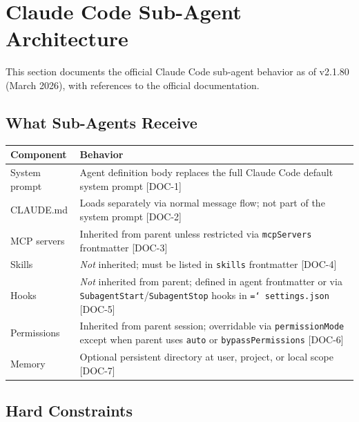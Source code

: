 \documentclass[a4paper,10pt]{article}
\newcommand{\fpath}[1]{\texttt{\hyphenchar\font=`\/ #1}}
\newcommand{\field}[1]{\texttt{#1}}
\newcommand{\coderef}[1]{\textsf{\small [#1]}}
\begin{document}
\section{Claude Code Sub-Agent Architecture}
\label{sec:architecture}

This section documents the official Claude Code sub-agent behavior
as of v2.1.80 (March 2026), with references to the official
documentation.

\subsection{What Sub-Agents Receive}

\begin{center}
\begin{tabularx}{\textwidth}{@{}lX@{}}
\toprule
\textbf{Component} & \textbf{Behavior} \\
\midrule
System prompt & Agent definition body replaces the full
  Claude Code default system prompt \coderef{DOC-1} \\
CLAUDE.md & Loads separately via normal message flow; not
  part of the system prompt \coderef{DOC-2} \\
MCP servers & Inherited from parent unless restricted via
  \field{mcpServers} frontmatter \coderef{DOC-3} \\
Skills & \emph{Not} inherited; must be listed in
  \field{skills} frontmatter \coderef{DOC-4} \\
Hooks & \emph{Not} inherited from parent; defined in
  agent frontmatter or via \field{SubagentStart}/\field{SubagentStop}
  hooks in \fpath{settings.json} \coderef{DOC-5} \\
Permissions & Inherited from parent session; overridable via
  \field{permissionMode} except when parent uses
  \field{auto} or \field{bypassPermissions} \coderef{DOC-6} \\
Memory & Optional persistent directory at user, project,
  or local scope \coderef{DOC-7} \\
\bottomrule
\end{tabularx}
\end{center}

\subsection{Hard Constraints}
\end{document}
